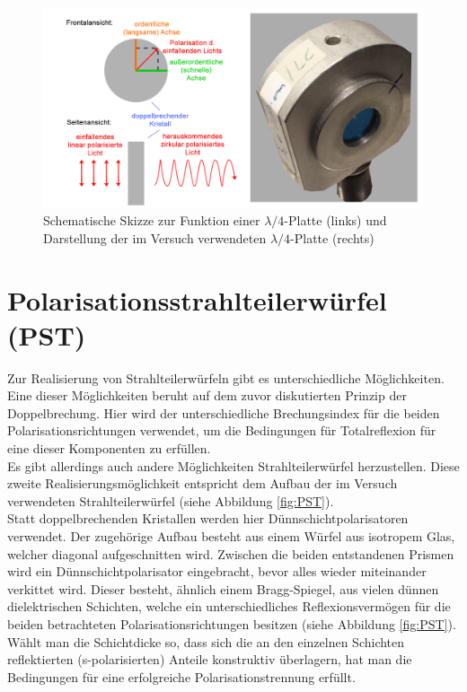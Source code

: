 \documentclass[
class=book,
accentcolor=1b,
custommargins=geometry,
fontsize=11pt,
thesis={type=Versuchsanleitung},
ruledheaders=all,
headline=false,
instbox=false,
marginpar=false,
title=small,
ignore-missing-data=true,
twoside=false,
logofile=apqdesign/tuda_logo.pdf,
pdfa=false %
]{apqpub}
\newtheorem{frage}[satz]{Frage}
\begin{document}
\\
	\begin{figure}[htb!]
			\centering
			\includegraphics[width=\textwidth]{graphics/LVPT.jpg}
			\caption{Schematische Skizze zur Funktion einer $\lambda/4$-Platte (links)
				und Darstellung der im Versuch verwendeten $\lambda/4$-Platte (rechts)}
			\label{fig:LVPT}
		\end{figure}
		
		\section{Polarisationsstrahlteilerwürfel (PST)}	
		Zur Realisierung von Strahlteilerwürfeln gibt es unterschiedliche Möglichkeiten. Eine dieser Möglichkeiten beruht auf dem zuvor diskutierten Prinzip der Doppelbrechung. Hier wird der unterschiedliche Brechungsindex für die beiden Polarisationsrichtungen verwendet, um die Bedingungen für Totalreflexion für eine dieser Komponenten zu erfüllen.\\
		Es gibt allerdings auch andere Möglichkeiten Strahlteilerwürfel herzustellen. Diese zweite Realisierungsmöglichkeit entspricht dem Aufbau der im Versuch verwendeten Strahlteilerwürfel (siehe Abbildung \ref{fig:PST}).\\ 
		Statt doppelbrechenden Kristallen werden hier Dünnschichtpolarisatoren verwendet. 
		Der zugehörige Aufbau besteht aus einem Würfel aus isotropem Glas, welcher diagonal aufgeschnitten wird. Zwischen die beiden entstandenen Prismen wird ein Dünnschichtpolarisator eingebracht, bevor alles wieder miteinander verkittet wird. Dieser besteht, ähnlich einem Bragg-Spiegel, aus vielen dünnen dielektrischen Schichten, welche ein unterschiedliches Reflexionsvermögen für die beiden betrachteten Polarisationsrichtungen besitzen (siehe Abbildung \ref{fig:PST}). 
		Wählt man die Schichtdicke so, dass sich die an den einzelnen Schichten reflektierten (s-polarisierten) Anteile konstruktiv überlagern, hat man die Bedingungen für eine erfolgreiche Polarisationstrennung erfüllt. \cite{EX}
\vspace{7pt}
		
\end{document}
